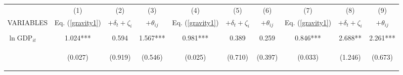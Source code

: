 \begin{center}
\begin{tabular}{lccccccccc} \hline
 & (1) & (2) & (3) & (4) & (5) & (6) & (7) & (8) & (9) \\
VARIABLES & Eq. (\ref{gravity1}) & $+\delta_t+\zeta_i$ & $+\theta_{ij}$ & Eq. (\ref{gravity1}) & $+\delta_t+\zeta_i$ & $+\theta_{ij}$ & Eq. (\ref{gravity1}) & $+\delta_t+\zeta_i$ & $+\theta_{ij}$ \\ \hline
\vspace{4pt} & \begin{footnotesize}\end{footnotesize} & \begin{footnotesize}\end{footnotesize} & \begin{footnotesize}\end{footnotesize} & \begin{footnotesize}\end{footnotesize} & \begin{footnotesize}\end{footnotesize} & \begin{footnotesize}\end{footnotesize} & \begin{footnotesize}\end{footnotesize} & \begin{footnotesize}\end{footnotesize} & \begin{footnotesize}\end{footnotesize} \\
$\ln\text{GDP}_{it}$ & 1.024*** & 0.594 & 1.567*** & 0.981*** & 0.389 & 0.259 & 0.846*** & 2.688** & 2.261*** \\
\vspace{4pt} & \begin{footnotesize}(0.027)\end{footnotesize} & \begin{footnotesize}(0.919)\end{footnotesize} & \begin{footnotesize}(0.546)\end{footnotesize} & \begin{footnotesize}(0.025)\end{footnotesize} & \begin{footnotesize}(0.710)\end{footnotesize} & \begin{footnotesize}(0.397)\end{footnotesize} & \begin{footnotesize}(0.033)\end{footnotesize} & \begin{footnotesize}(1.246)\end{footnotesize} & \begin{footnotesize}(0.673)\end{footnotesize} \\

\end{tabular}
\end{center}
